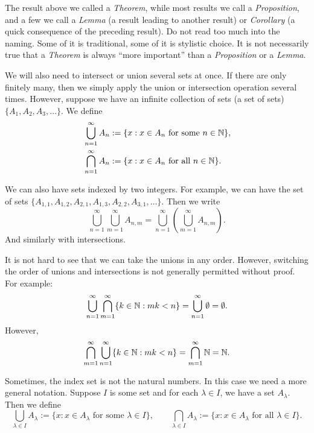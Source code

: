The result above we called a \emph{Theorem}, while most results we call
a \emph{Proposition}, and a few we call a \emph{Lemma} (a result leading to another result) or
\emph{Corollary} (a quick consequence of the preceding result).
Do not read too much into
the naming.  Some of it is traditional, some of it is stylistic choice.
It is not necessarily true that a \emph{Theorem} is always ``more important'' than a
\emph{Proposition} or a \emph{Lemma}.

We will also need to intersect or union several sets at once.  If there are
only finitely many, then we simply apply the union or intersection operation
several times.  However, suppose we have an infinite collection
of sets (a set of sets)
$\{ A_1, A_2, A_3, \ldots \}$.  We define
\begin{align*}
& \bigcup_{n=1}^\infty A_n := \{ x : x \in A_n \text{ for some $n \in {\mathbb{N}}$}
\} , \\
& \bigcap_{n=1}^\infty A_n := \{ x : x \in A_n \text{ for all $n \in {\mathbb{N}}$}
\} .
\end{align*}

We can also have sets indexed by two integers.  For example, we can have
the set of sets
$\{ A_{1,1}, A_{1,2}, A_{2,1}, A_{1,3}, A_{2,2}, A_{3,1}, \ldots \}$.  Then
we write 
\begin{equation*}
\bigcup_{n=1}^\infty \bigcup_{m=1}^\infty A_{n,m}
=
\bigcup_{n=1}^\infty \left( \bigcup_{m=1}^\infty A_{n,m} \right) .
\end{equation*}
And similarly with intersections.

It is not hard to see that we can take the unions in any order.  However,
switching the order of unions and intersections is not generally permitted without proof.
For example:
\begin{equation*}
\bigcup_{n=1}^\infty
\bigcap_{m=1}^\infty
\{ k \in {\mathbb{N}} : mk < n \}
=
\bigcup_{n=1}^\infty \emptyset = \emptyset .
\end{equation*}
However,
\begin{equation*}
\bigcap_{m=1}^\infty
\bigcup_{n=1}^\infty
\{ k \in {\mathbb{N}} : mk < n \}
=
\bigcap_{m=1}^\infty
{\mathbb{N}}
=
{\mathbb{N}}.
\end{equation*}

Sometimes, the index set is not the natural numbers.  In this case we need a
more general notation.  Suppose $I$ is some set and for each $\lambda \in
I$, we have a set $A_\lambda$.  Then we define
\begin{equation*}
\bigcup_{\lambda \in I} A_\lambda := \{ x : x \in A_\lambda \text{ for some $\lambda \in I$}
\} ,
\qquad
\bigcap_{\lambda \in I} A_\lambda := \{ x : x \in A_\lambda \text{ for all $\lambda \in I$}
\} .
\end{equation*}

